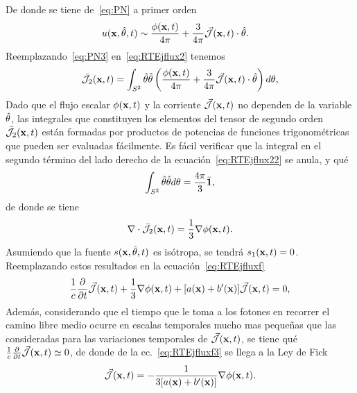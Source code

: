 De donde se tiene de~\eqref{eq:PN} a primer orden
\begin{equation}
\begin{split}
\begin{aligned}
u(\mathbf{x},\hat{\theta},t)&\sim \frac{\phi(\mathbf{x},t)}{4\pi}+\frac{3}{4\pi} \vec{ \mathcal{J}}(\mathbf{x},t) \cdot \hat{\theta}.
\end{aligned}
\end{split}
\label{eq:PN3}
\end{equation}
Reemplazando~\eqref{eq:PN3} en~\eqref{eq:RTEjflux2} tenemos
\begin{equation}
\bar{\mathcal{J}}_2(\mathbf{x},t)=\int_{S^2} \hat{\theta} \hat{\theta} \left(  \frac{\phi(\mathbf{x},t)}{4\pi}+\frac{3}{4\pi} \vec{ \mathcal{J}}(\mathbf{x},t) \cdot \hat{\theta} \right) d\theta,
\label{eq:RTEjflux22}
\end{equation}
Dado que el flujo escalar $\phi(\mathbf{x},t)$ y la corriente $\vec{ \mathcal{J}}(\mathbf{x},t)$ no dependen de la variable $\hat{\theta}$, las integrales que 
constituyen los elementos del tensor de segundo orden $\bar{\mathcal{J}}_2(\mathbf{x},t)$ están formadas 
por productos de potencias de funciones trigonométricas que pueden ser evaluadas fácilmente. 
Es fácil verificar que la integral en el segundo término del lado derecho de la ecuación~\eqref{eq:RTEjflux22} se anula, y qué~\cite[cap. 17, p. 544]{Modest2013}
\begin{equation}
\int_{S^2} \hat{\theta} \hat{\theta} d\theta=\frac{4\pi}{3} \bar{\mathbf{1}},
\label{eq:RTEjflux22}
\end{equation}
de donde se tiene 
\begin{equation}
\nabla \cdot \bar{\mathcal{J}}_2(\mathbf{x},t)=\frac{1}{3}\nabla \phi(\mathbf{x},t).
\label{eq:RTEjflux23}
\end{equation}
Asumiendo que la fuente $s(\mathbf{x},\hat{\theta},t)$ es isótropa, se tendrá $s_1(\mathbf{x},t)= 0$. Reemplazando estos resultados en la ecuación~\eqref{eq:RTEjfluxf}
\begin{equation}
\begin{split}
\begin{aligned}
\frac{1}{c}\frac{\partial}{\partial t} \vec{ \mathcal{J}}(\mathbf{x},t)+\frac{1}{3}\nabla  \phi(\mathbf{x},t) +[a(\mathbf{x})+b'(\mathbf{x})]\vec{ \mathcal{J}}(\mathbf{x},t)=0,
\end{aligned}
\end{split}
\label{eq:RTEjfluxf3}
\end{equation}
Además, considerando que el tiempo que le toma a los fotones en recorrer 
el camino libre medio ocurre en escalas temporales mucho 
mas pequeñas que las consideradas para las variaciones temporales de $\vec{ \mathcal{J}}(\mathbf{x},t)$, se 
tiene qué $\frac{1}{c}\frac{\partial}{\partial t} \vec{ \mathcal{J}}(\mathbf{x},t) \simeq 0$, de donde de 
la ec.~\eqref{eq:RTEjfluxf3} se llega a la Ley de Fick
\begin{equation}
\begin{split}
\begin{aligned}
\vec{ \mathcal{J}}(\mathbf{x},t)=-\frac{1}{3[a(\mathbf{x})+b'(\mathbf{x})]} \nabla  \phi(\mathbf{x},t) .
\end{aligned}
\end{split}
\label{eq:Fick}
\end{equation}
